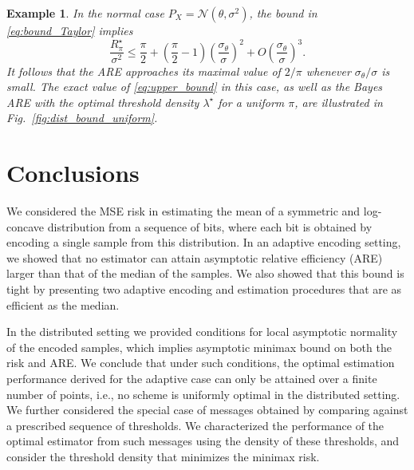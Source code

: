 \documentclass[letterpaper, 11pt]{IEEEtran}      %
\newtheorem{example}{\bf {Example}}
\newcommand{\Ncal}{\mathcal{N}}
\begin{document}
\begin{example} \label{ex:bound}
In the normal case $P_X = \Ncal(\theta, \sigma^2)$, the bound in \eqref{eq:bound_Taylor} implies 
\[
\frac{R^\star_\pi}{\sigma^2}  \leq \frac{\pi}{2} + \left( \frac{\pi}{2} -1 \right) \left( \frac{ \sigma_\theta}{\sigma} \right)^2 + O \left(  \frac{\sigma_\theta} { \sigma} \right)^3. 
\]
It follows that the ARE approaches its maximal value of $2/\pi$ whenever $\sigma_\theta/\sigma$ is small. The exact value of \eqref{eq:upper_bound} in this case, as well as the Bayes ARE with the optimal threshold density $\lambda^\star$ for a uniform $\pi$, are illustrated in Fig.~\ref{fig:dist_bound_uniform}. 
\end{example}

\section{Conclusions \label{sec:conclusions}}
We considered the MSE risk in estimating the mean of a symmetric and log-concave distribution from a sequence of bits, where each bit is obtained by encoding a single sample from this distribution. 
%
In an adaptive encoding setting, we showed that no estimator can attain asymptotic relative efficiency (ARE) larger than that of the median of the samples. We also showed that this bound is tight by presenting two adaptive encoding and estimation procedures that are as efficient as the median. 
\par
In the distributed setting we provided conditions for local asymptotic normality of the encoded samples, which implies asymptotic minimax bound on both the risk and ARE. 
%
We conclude that under such conditions, the optimal estimation performance derived for the adaptive case can only be attained over a finite number of points, i.e., no scheme is uniformly optimal in the distributed setting. 
%
We further considered the special case of messages obtained by comparing against a prescribed sequence of thresholds. We characterized the performance of the optimal estimator from such messages using the density of these thresholds, and consider the threshold density that minimizes the minimax risk. 
\end{document}
